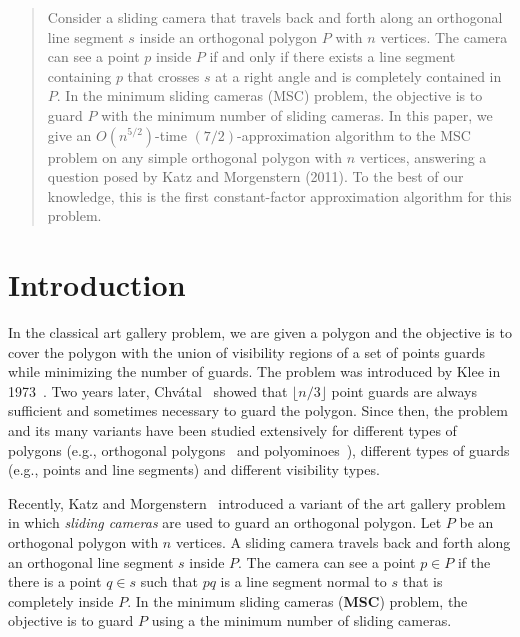 \documentclass{llncs}
\begin{document}
\begin{abstract}
Consider a sliding camera that travels back and forth along
an orthogonal line segment $s$ inside an orthogonal polygon $P$ with $n$ vertices. The camera can see a point $p$ inside
$P$ if and only if there exists a line segment containing $p$ that crosses $s$ at a right angle and 
is completely contained in $P$. In the minimum sliding cameras (MSC)
problem, the objective is to guard $P$ with the minimum number of sliding cameras.
In this paper, we give an $O(n^{5/2})$-time $(7/2)$-approximation algorithm to the
MSC problem on any simple orthogonal polygon with $n$ vertices,
answering a question posed by Katz and Morgenstern (2011).
To the best of our knowledge, this is the first constant-factor approximation algorithm for this problem.
\end{abstract}

\section{Introduction}
\label{sec:introduction}
In the classical art gallery problem, we are given
a polygon and the objective is to cover the polygon with the union of visibility
regions of a set of points guards while minimizing the number of guards. The problem was introduced by Klee
in 1973~\cite{orourke1987}. Two years later, Chv\'{a}tal~\cite{chvatal1975} showed that $\lfloor n/3\rfloor$
point guards are always sufficient and sometimes necessary to guard the polygon.
Since then, the problem and its many variants have been studied extensively for
different types of polygons (e.g., orthogonal polygons~\cite{dietmar1995} and polyominoes~\cite{biedl2012}), different types of
guards (e.g., points and line segments) and different visibility types.

Recently, Katz and Morgenstern~\cite{katz2011} introduced a variant of the art gallery problem
in which \emph{sliding cameras} are used to guard an
orthogonal polygon. Let $P$ be an orthogonal polygon with $n$ vertices. A sliding camera travels back and forth along an
orthogonal line segment $s$ inside $P$. The camera can
see a point $p\in P$ if the there is a point $q\in s$ such that
$pq$ is a line segment normal to $s$ that is completely inside $P$. In the minimum
sliding cameras ({\bf MSC}) problem, the objective is to guard $P$ using a
the minimum number of sliding cameras.
\end{document}
